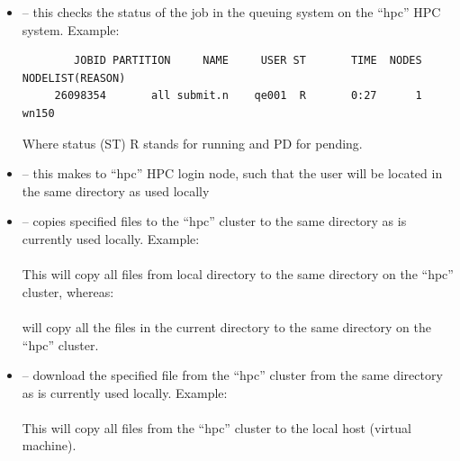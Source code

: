 \documentclass[landscape]{foils}
\begin{document}
{\begin{itemize}
  \vspace{0.5em}

\item {} -- this checks the status of the job in the queuing
  system on the ``hpc'' HPC system. Example:\\[0.5em]
  {\green\burgundy
    \begin{verbatim}
        JOBID PARTITION     NAME     USER ST       TIME  NODES NODELIST(REASON)
     26098354       all submit.n    qe001  R       0:27      1 wn150
\end{verbatim}}
    Where status (ST) R stands for running and PD for pending.
  \vspace{0.5em}
  
\item {} -- this makes  to ``hpc'' HPC login node,
  such that the user will be located in the same directory as used
  locally
  \vspace{0.5em}
  
\item {} -- copies specified files to the
  ``hpc'' cluster to the same directory as is currently
  used locally. Example:\\[0.5em]
  \\[0.5em]
  This will copy all  files from local directory to the
  same directory on the ``hpc'' cluster, whereas:\\[0.5em]
  \\[0.5em]
  will copy all the files in the current directory to the same
  directory on the ``hpc'' cluster.
  \vspace{0.5em}
  
\item {} -- download the specified file from
  the ``hpc'' cluster from the same directory as is
  currently used locally. Example:\\[0.5em]
  \\[0.5em]
  This will copy all  files from the ``hpc'' cluster to
  the local host (virtual machine).
\end{itemize}
}
\end{document}
